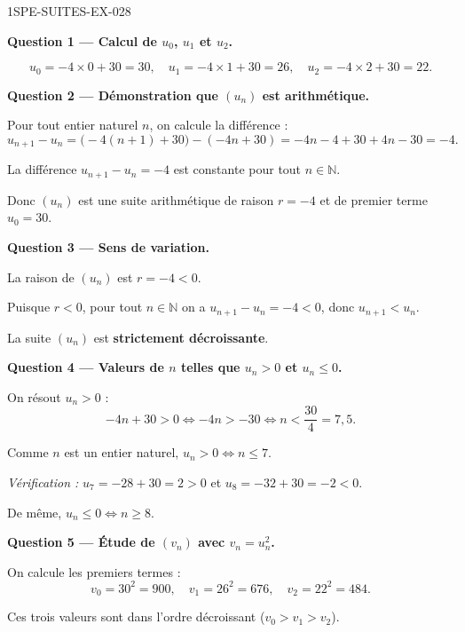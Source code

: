 \begin{corrige}{1SPE-SUITES-EX-028}

\textbf{Question 1 — Calcul de $u_0$, $u_1$ et $u_2$.}

\[
  u_0 = -4 \times 0 + 30 = 30, \quad u_1 = -4 \times 1 + 30 = 26, \quad u_2 = -4 \times 2 + 30 = 22.
\]

\medskip
\textbf{Question 2 — Démonstration que $(u_n)$ est arithmétique.}

Pour tout entier naturel $n$, on calcule la différence :
\[
  u_{n+1} - u_n = \bigl(-4(n+1) + 30\bigr) - (-4n + 30) = -4n - 4 + 30 + 4n - 30 = -4.
\]


La différence $u_{n+1} - u_n = -4$ est constante pour tout $n \in \mathbb{N}$.

Donc $(u_n)$ est une suite arithmétique de raison $r = -4$ et de premier terme $u_0 = 30$.

\medskip
\textbf{Question 3 — Sens de variation.}

La raison de $(u_n)$ est $r = -4 < 0$.


Puisque $r < 0$, pour tout $n \in \mathbb{N}$ on a $u_{n+1} - u_n = -4 < 0$, donc $u_{n+1} < u_n$.

La suite $(u_n)$ est \textbf{strictement décroissante}.

\medskip
\textbf{Question 4 — Valeurs de $n$ telles que $u_n > 0$ et $u_n \leq 0$.}

On résout $u_n > 0$ :
\[
  -4n + 30 > 0 \iff -4n > -30 \iff n < \frac{30}{4} = 7{,}5.
\]

Comme $n$ est un entier naturel, $u_n > 0 \iff n \leq 7$.

\textit{Vérification :} $u_7 = -28 + 30 = 2 > 0$ et $u_8 = -32 + 30 = -2 < 0$. \checkmark

De même, $u_n \leq 0 \iff n \geq 8$.


\medskip
\textbf{Question 5 — Étude de $(v_n)$ avec $v_n = u_n^2$.}

On calcule les premiers termes :
\[
  v_0 = 30^2 = 900, \quad v_1 = 26^2 = 676, \quad v_2 = 22^2 = 484.
\]

Ces trois valeurs sont dans l'ordre décroissant ($v_0 > v_1 > v_2$).


\end{corrige}
